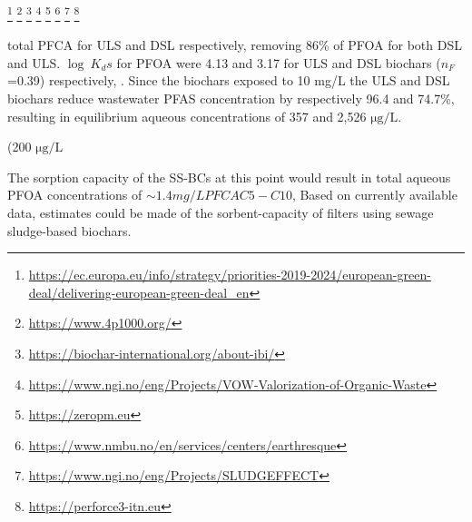 \footnote{\url{https://ec.europa.eu/info/strategy/priorities-2019-2024/european-green-deal/delivering-european-green-deal_en}}
\footnote{\url{https://www.4p1000.org/}}
\footnote{\url{https://biochar-international.org/about-ibi/}}
\footnote{\url{https://www.ngi.no/eng/Projects/VOW-Valorization-of-Organic-Waste}}
\footnote{\url{https://zeropm.eu}}
\footnote{\url{https://www.nmbu.no/en/services/centers/earthresque}}
\footnote{\url{https://www.ngi.no/eng/Projects/SLUDGEFFECT}}
\footnote{\url{https://perforce3-itn.eu}}

 total PFCA for ULS and DSL respectively, removing 86\% of PFOA for both DSL and ULS.  $\log~K_ds$ for PFOA were 4.13 and 3.17 for ULS and DSL biochars ($n_F$=0.39) respectively, . Since the biochars exposed to 10 mg/L the ULS and DSL biochars reduce wastewater PFAS concentration by respectively 96.4 and 74.7\%, resulting in equilibrium aqueous concentrations of 357 and 2,526 $\mathrm{\mu g/L}$. 
 
 (200 $\mathrm{\mu g/L}$
 
 The sorption capacity of the SS-BCs at this point would result in total aqueous PFOA concentrations of $\sim 1.4 mg/L PFCA C5-C10$,
 Based on currently available data, estimates could be made of the sorbent-capacity of filters using sewage sludge-based biochars.